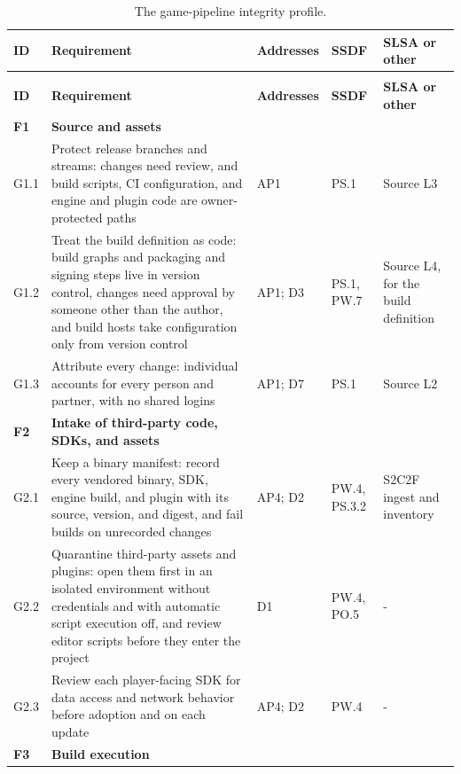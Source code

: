\documentclass[acmsmall,screen,review]{acmart}
\begin{document}
\begingroup
\footnotesize
\begin{xltabular}{\linewidth}{@{}>{\hsize\raggedright\arraybackslash}X>{\hsize\raggedright\arraybackslash}X>{\hsize\raggedright\arraybackslash}X>{\hsize\raggedright\arraybackslash}X>{\hsize\raggedright\arraybackslash}X@{}}
\caption{The game-pipeline integrity profile.}\label{tab:4}\\
\toprule
\textbf{ID} & \textbf{Requirement} & \textbf{Addresses} & \textbf{SSDF} & \textbf{SLSA or other} \\
\midrule
\endfirsthead
{}\\
\toprule
\textbf{ID} & \textbf{Requirement} & \textbf{Addresses} & \textbf{SSDF} & \textbf{SLSA or other} \\
\midrule
\endhead
\bottomrule
\endlastfoot
\textbf{F1} & \textbf{Source and assets} &  &  &  \\
G1.1 & Protect release branches and streams: changes need review, and build scripts, CI configuration, and engine and plugin code are owner-protected paths & AP1 & PS.1 & Source L3 \\
G1.2 & Treat the build definition as code: build graphs and packaging and signing steps live in version control, changes need approval by someone other than the author, and build hosts take configuration only from version control & AP1; D3 & PS.1, PW.7 & Source L4, for the build definition \\
G1.3 & Attribute every change: individual accounts for every person and partner, with no shared logins & AP1; D7 & PS.1 & Source L2 \\
\textbf{F2} & \textbf{Intake of third-party code, SDKs, and assets} &  &  &  \\
G2.1 & Keep a binary manifest: record every vendored binary, SDK, engine build, and plugin with its source, version, and digest, and fail builds on unrecorded changes & AP4; D2 & PW.4, PS.3.2 & S2C2F ingest and inventory \cite{openndsecure} \\
G2.2 & Quarantine third-party assets and plugins: open them first in an isolated environment without credentials and with automatic script execution off, and review editor scripts before they enter the project & D1 & PW.4, PO.5 & - \\
G2.3 & Review each player-facing SDK for data access and network behavior before adoption and on each update & AP4; D2 & PW.4 & - \\
\textbf{F3} & \textbf{Build execution} &  &  &  \\

\end{xltabular}
\end{document}
